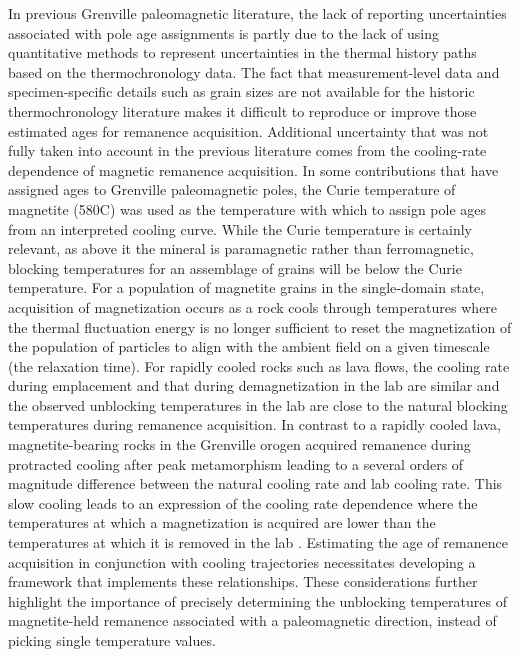 In previous Grenville paleomagnetic literature, the lack of reporting uncertainties associated with pole age assignments is partly due to the lack of using quantitative methods to represent uncertainties in the thermal history paths based on the thermochronology data. The fact that measurement-level data and specimen-specific details such as grain sizes are not available for the historic thermochronology literature makes it difficult to reproduce or improve those estimated ages for remanence acquisition. Additional uncertainty that was not fully taken into account in the previous literature comes from the cooling-rate dependence of magnetic remanence acquisition. In some contributions that have assigned ages to Grenville paleomagnetic poles, the Curie temperature of magnetite (580\textdegree C) was used as the temperature with which to assign pole ages from an interpreted cooling curve. While the Curie temperature is certainly relevant, as above it the mineral is paramagnetic rather than ferromagnetic, blocking temperatures for an assemblage of grains will be below the Curie temperature. For a population of magnetite grains in the single-domain state, acquisition of magnetization occurs as a rock cools through temperatures where the thermal fluctuation energy is no longer sufficient to reset the magnetization of the population of particles to align with the ambient field on a given timescale (the relaxation time). For rapidly cooled rocks such as lava flows, the cooling rate during emplacement and that during demagnetization in the lab are similar and the observed unblocking temperatures in the lab are close to the natural blocking temperatures during remanence acquisition. In contrast to a rapidly cooled lava, magnetite-bearing rocks in the Grenville orogen acquired remanence during protracted cooling after peak metamorphism leading to a several orders of magnitude difference between the natural cooling rate and lab cooling rate. This slow cooling leads to an expression of the cooling rate dependence where the temperatures at which a magnetization is acquired are lower than the temperatures at which it is removed in the lab \citep{Pullaiah1975b, Halgedahl1980a, Dodson1980a}. Estimating the age of remanence acquisition in conjunction with cooling trajectories necessitates developing a framework that implements these relationships. These considerations further highlight the importance of precisely determining the unblocking temperatures of magnetite-held remanence associated with a paleomagnetic direction, instead of picking single temperature values. 

